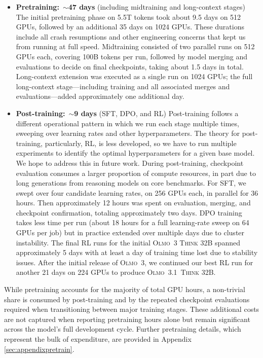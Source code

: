 \documentclass[table]{ai2style/ai2}
\newcommand{\newOlmo}{Olmo\xspace}
\newcommand{\olmothree}{\textsc{\newOlmo~3}\xspace}
\newcommand{\olmothreeonethink}{\textsc{\newOlmo~3.1~Think}\xspace}
\newcommand{\olmothreethinking}{\textsc{Olmo~3 Think}\xspace}
\begin{document}
\begin{itemize}
    \item {\bf{Pretraining:}}~$\mathbf{\sim}${\bf{47 days}} (including midtraining and long-context stages) The initial pretraining phase on 5.5T tokens took about 9.5 days on 512 GPUs, followed by an additional 35 days on 1024 GPUs.
    These durations include all crash resumptions and other engineering concerns that kept us from running at full speed.
    Midtraining consisted of two parallel runs on 512 GPUs each, covering 100B tokens per run, followed by model merging and evaluations to decide on final checkpoints, taking about 1.5 days in total.
    Long-context extension was executed as a single run on 1024 GPUs; the full long-context stage---including training and all associated merges and evaluations---added approximately one additional day.
    \item {\bf{Post-training:}}~$\mathbf{\sim}${\bf{9 days}} (SFT, DPO, and RL) Post-training follows a different operational pattern in which we run each stage multiple times, sweeping over learning rates and other hyperparameters.
    The theory for post-training, particularly, RL, is less developed, so we have to run multiple experiments to identify the optimal hyperparameters for a given base model. 
    We hope to address this in future work.
    During post-training, checkpoint evaluation consumes a larger proportion of compute resources, in part due to long generations from reasoning models on core benchmarks.
    For SFT, we swept over four candidate learning rates, on 256 GPUs each, in parallel for 36 hours. Then approximately 12 hours was spent on evaluation, merging, and checkpoint confirmation, totaling approximately two days.
    DPO training takes less time per run (about 18 hours for a full learning-rate sweep on 64 GPUs per job) but in practice extended over multiple days due to cluster instability.
    The final RL runs for the initial \olmothreethinking 32B spanned approximately 5 days with at least a day of training time lost due to stability issues.
    After the initial release of \olmothree, we continued our best RL run for another 21 days on 224 GPUs to produce \olmothreeonethink 32B.
\end{itemize}

While pretraining accounts for the majority of total GPU hours, a non-trivial share is consumed by post-training and by the repeated checkpoint evaluations required when transitioning between major training stages. These additional costs are not captured when reporting pretraining hours alone but remain significant across the model’s full development cycle. Further pretraining details, which represent the bulk of expenditure, are provided in Appendix \ref{sec:appendixpretrain}.
\end{document}
